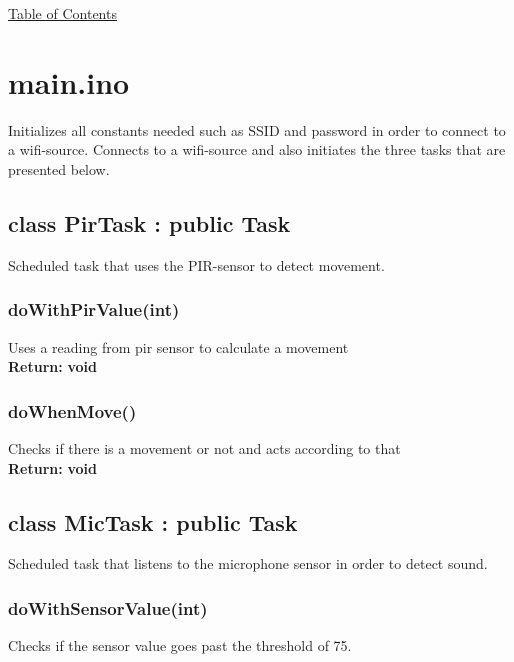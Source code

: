 \documentclass[11pt, numbers=endperiod]{report}
\newcommand{\Vseparation}{\vspace{10mm}}
\newcommand{\setColor}[1]
			{\color{blue!}\textbf{#1}\color{black!}}
\newcommand\MySection[2][\DefaultOpt]{%
  \def\DefaultOpt{#2}%
  \color{cyan!}\section[#1]{#2}\color{black!}%
}
\begin{document}
\hyperlink{toc}{Table of Contents}





\MySection{main.ino}
\label{sec: main.ino}
\begin{tcolorbox}[colback=white,colframe=cyan,width=\dimexpr\textwidth+12mm\relax,enlarge left by=-6mm]

Initializes all constants needed such as SSID and password in order to connect to a wifi-source. Connects to a wifi-source and also initiates the three tasks that are presented below.
\subsection*{class PirTask : public Task}
Scheduled task that uses the PIR-sensor to detect movement.\\
\begin{tcolorbox}[colback=white,colframe=cyan,width=\dimexpr\textwidth+4mm\relax,enlarge left by=-2mm]


\subsubsection*{doWithPirValue(int)}
Uses a reading from pir sensor to calculate a movement\\

\textbf{Return:} \setColor{void}
\Vseparation
\subsubsection*{doWhenMove()}
Checks if there is a movement or not and acts according to that\\

\textbf{Return:} \setColor{void}
\Vseparation

\end{tcolorbox}

\subsection*{class MicTask : public Task}
Scheduled task that listens to the microphone sensor in order to detect sound.\\
\begin{tcolorbox}[colback=white,colframe=cyan,width=\dimexpr\textwidth+4mm\relax,enlarge left by=-2mm]

\subsubsection*{doWithSensorValue(int)}
Checks if the sensor value goes past the threshold of 75.\\


\end{tcolorbox}
\end{tcolorbox}
\end{document}
